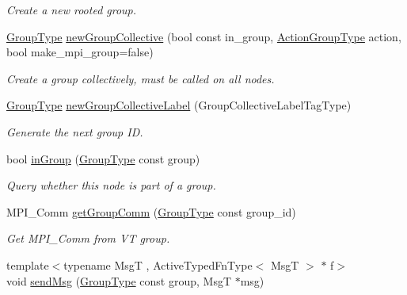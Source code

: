 \begin{DoxyCompactItemize}
\begin{DoxyCompactList}\small\item\em Create a new rooted group. \end{DoxyCompactList}\item 
\hyperlink{namespacevt_a27b5e4411c9b6140c49100e050e2f743}{Group\+Type} \hyperlink{structvt_1_1group_1_1_group_manager_a92b301d6cf77af7d57ed822c6f044d58}{new\+Group\+Collective} (bool const in\+\_\+group, \hyperlink{structvt_1_1group_1_1_group_manager_ae871c5871ad62b530220009c1ee4d4b9}{Action\+Group\+Type} action, bool make\+\_\+mpi\+\_\+group=false)
\begin{DoxyCompactList}\small\item\em Create a group collectively, must be called on all nodes. \end{DoxyCompactList}\item 
\hyperlink{namespacevt_a27b5e4411c9b6140c49100e050e2f743}{Group\+Type} \hyperlink{structvt_1_1group_1_1_group_manager_aabd66a33c6306ef472119cd5b2d96d3f}{new\+Group\+Collective\+Label} (Group\+Collective\+Label\+Tag\+Type)
\begin{DoxyCompactList}\small\item\em Generate the next group ID. \end{DoxyCompactList}\item 
bool \hyperlink{structvt_1_1group_1_1_group_manager_a2204bcd119aaf06e0e356957faad36e6}{in\+Group} (\hyperlink{namespacevt_a27b5e4411c9b6140c49100e050e2f743}{Group\+Type} const group)
\begin{DoxyCompactList}\small\item\em Query whether this node is part of a group. \end{DoxyCompactList}\item 
M\+P\+I\+\_\+\+Comm \hyperlink{structvt_1_1group_1_1_group_manager_a15492a3874bd670c18336571e9768e8e}{get\+Group\+Comm} (\hyperlink{namespacevt_a27b5e4411c9b6140c49100e050e2f743}{Group\+Type} const group\+\_\+id)
\begin{DoxyCompactList}\small\item\em Get M\+P\+I\+\_\+\+Comm from VT group. \end{DoxyCompactList}\item 
{\footnotesize template$<$typename MsgT , Active\+Typed\+Fn\+Type$<$ Msg\+T $>$ $\ast$ f$>$ }\\void \hyperlink{structvt_1_1group_1_1_group_manager_a8c44aa4d3c569c0a6c73c91c9927552a}{send\+Msg} (\hyperlink{namespacevt_a27b5e4411c9b6140c49100e050e2f743}{Group\+Type} const group, MsgT $\ast$msg)

\end{DoxyCompactItemize}
